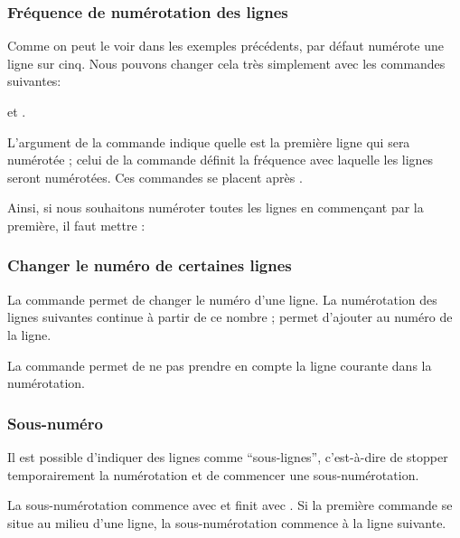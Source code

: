 \subsubsection{Fréquence de numérotation des lignes}

Comme on peut le voir dans les exemples précédents, par défaut  numérote  une ligne sur cinq. Nous pouvons changer cela très simplement avec les commandes suivantes:

 et .

L'argument  de la commande  indique quelle est  la première ligne qui sera numérotée 
; celui de la commande  définit la fréquence avec laquelle les lignes seront numérotées. Ces commandes se placent après . 

Ainsi, si nous souhaitons numéroter toutes les lignes en commençant par la première, il faut mettre :

\begin{latexcode}
\end{latexcode}



\subsubsection{Changer le numéro de certaines lignes}

La commande  permet de changer le numéro d'une ligne. La numérotation des lignes suivantes  continue à partir de ce nombre ;  permet d'ajouter  au numéro de la ligne.

La commande  permet de ne pas prendre en compte la ligne courante dans la numérotation.

\subsubsection{Sous-numéro}

Il est possible d'indiquer  des lignes comme \enquote{sous-lignes}, c'est-à-dire de stopper temporairement la numérotation et de commencer une sous-numérotation.

La sous-numérotation commence avec  et  finit avec .
Si la première commande se situe au milieu d'une ligne, la sous-numérotation commence à la ligne suivante.

